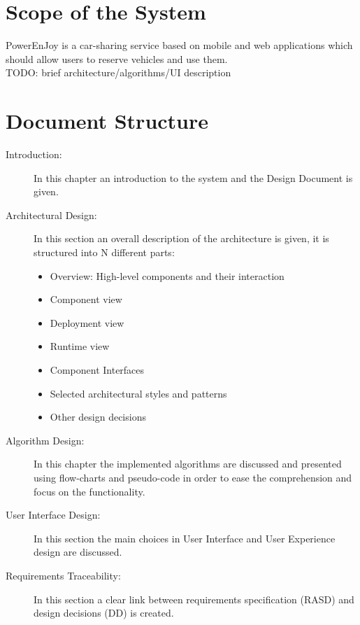 \section{Scope of the System}
PowerEnJoy is a car-sharing service based on mobile and web applications which should allow users to reserve vehicles and use them.
\\TODO: brief architecture/algorithms/UI description
\section{Document Structure}
\begin{description} 
	\item[Introduction: ] In this chapter an introduction to the system and the Design Document is given.
	\item[Architectural Design: ] In this section an overall description of the architecture is given, it is structured into N different parts: 
		\begin{itemize}
			\item Overview: High-level components and their interaction
			\item Component view
			\item Deployment view
			\item Runtime view
			\item Component Interfaces
			\item Selected architectural styles and patterns
			\item Other design decisions
		\end{itemize}
	\item[Algorithm Design: ] In this chapter the implemented algorithms are discussed and presented using flow-charts and pseudo-code in order to ease the comprehension and focus on the functionality.
	\item[User Interface Design: ] In this section the main choices in User Interface and User Experience design are discussed.
	\item[Requirements Traceability: ] In this section a clear link between requirements specification (RASD) and design decisions (DD) is created.
\end{description}